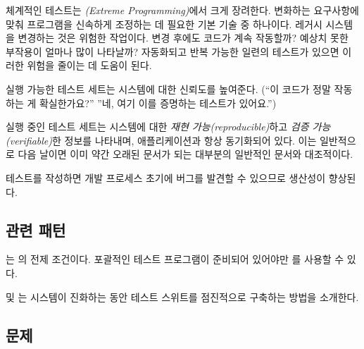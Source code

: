 \documentclass[a4paper,10pt,twoside]{book}
\begin{document}
체계적인 테스트는 \emph{(Extreme Programming)}에서 크게 장려한다. \cite{Beck00a} 변화하는 요구사항에 맞춰 프로그램을 신속하게 조정하는 데 필요한 기본 기술 중 하나이다. 레거시 시스템을 변경하는 것은 위험한 작업이다. 변경 후에도 코드가 계속 작동할까? 예상치 못한 부작용이 얼마나 많이 나타날까? 자동화되고 반복 가능한 일련의 테스트가 있으면 이러한 위험을 줄이는 데 도움이 된다. 

\begin{bulletlist}
\item 실행 가능한 테스트 세트는 시스템에 대한 신뢰도를 높여준다. (``이 코드가 정말 작동하는 게 확실한가요?'' ''네, 여기 이를 증명하는 테스트가 있어요.'')
\item 실행 중인 테스트 세트는 시스템에 대한 \emph{재현 가능(reproducible)}하고 \emph{검증 가능(verifiable)}한 정보를 나타내며, 애플리케이션과 항상 동기화되어 있다. 이는 일반적으로 다음 날이면 이미 약간 오래된 문서가 되는 대부분의 일반적인 문서와 대조적이다.
\item 테스트를 작성하면 개발 프로세스 초기에 버그를 발견할 수 있으므로 생산성이 향상된다.
\end{bulletlist}

\subsection*{관련 패턴}

는 의 전제 조건이다. 포괄적인 테스트 프로그램이 준비되어 있어야만 를 사용할 수 있다. 

 및 는 시스템이 진화하는 동안 테스트 스위트를 점진적으로 구축하는 방법을 소개한다. 




\subsection*{문제}
\end{document}
